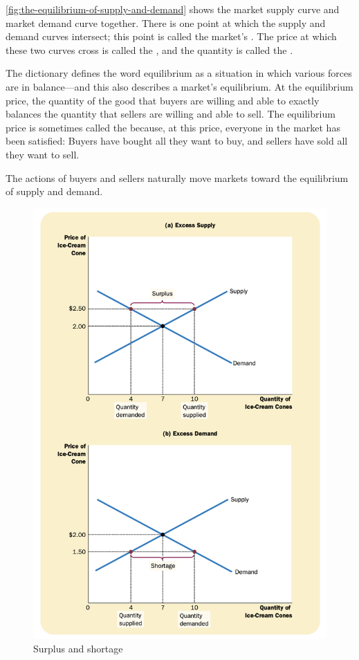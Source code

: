 \ref{fig:the-equilibrium-of-supply-and-demand} shows the market supply curve and market demand curve together.
There is one point at which the supply and demand curves intersect;
this point is called the market's .
The price at which these two curves cross is called the , and
the quantity is called the .


The dictionary defines the word equilibrium as a situation in which various forces are in balance—and this also describes a market’s equilibrium.
At the equilibrium price, the quantity of the good that buyers are willing and able to exactly balances the quantity that sellers are willing and able to sell.
The equilibrium price is sometimes called the  because, at this price, everyone in the market has been satisfied: Buyers have bought all they want to buy, and sellers have sold all they want to sell.


The actions of buyers and sellers naturally move markets toward the equilibrium of supply and demand.

\begin{figure}[!ht]
  \centering
  \includegraphics{pics/surplus-and-shortage}
  \caption{Surplus and shortage}
  \label{fig:surplus-and-shortage}
\end{figure}


